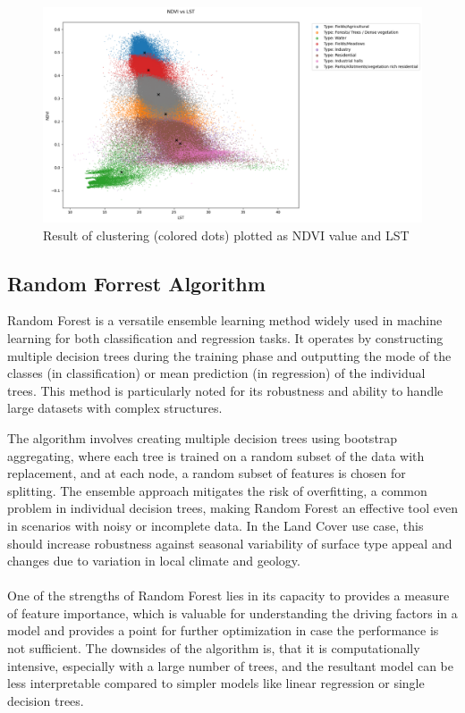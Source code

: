 \documentclass[12pt,a4paper, english]{article}
\begin{document}
    \begin{figure}[!htbp]
      \centering
      \includegraphics[width=\textwidth]{img/NDVI vs LST.png}
      \caption{Result of clustering (colored dots) plotted as \gls{NDVI} value and \gls{LST}\label{fig:kmeansclusters}}
    \end{figure}

 \subsection{Random Forrest Algorithm}\label{sec:randomForrest}
Random Forest is a versatile ensemble learning method widely used in machine learning for both classification and regression tasks.
It operates by constructing multiple decision trees during the training phase and outputting the mode of the classes (in classification) or mean prediction (in regression) of the individual trees.
This method is particularly noted for its robustness and ability to handle large datasets with complex structures.

The algorithm involves creating multiple decision trees using bootstrap aggregating, where each tree is trained on a random subset of the data with replacement, and at each node, a random subset of features is chosen for splitting.
The ensemble approach mitigates the risk of overfitting, a common problem in individual decision trees, making Random Forest an effective tool even in scenarios with noisy or incomplete data. 
In the Land Cover use case, this should increase robustness against seasonal variability of surface type appeal and changes due to variation in local climate and geology.\\ \\

One of the strengths of Random Forest lies in its capacity to provides a measure of feature importance, which is valuable for understanding the driving factors in a model and provides a point for further optimization in case the performance is not sufficient.
The downsides of the algorithm is, that it is computationally intensive, especially with a large number of trees, and the resultant model can be less interpretable compared to simpler models like linear regression or single decision trees.\\
\end{document}

